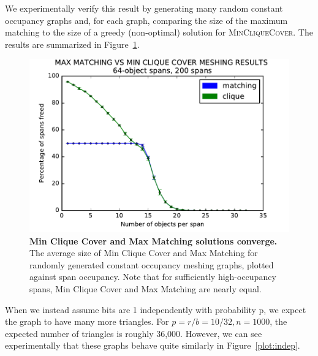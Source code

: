 We experimentally verify this result by generating many random constant occupancy graphs and, for each graph, comparing the size of the maximum matching to the size of a greedy (non-optimal) solution for \textsc{MinCliqueCover}.  The results are summarized in Figure~\ref{plot:const}.

\begin{figure}[h]
\includegraphics[scale = .5]{figures/const_match_comp.pdf}
\centering
\caption{\textbf{Min Clique Cover and Max Matching solutions converge.} The average size of Min Clique Cover and Max Matching for randomly generated constant occupancy meshing graphs, plotted against span occupancy.  Note that for sufficiently high-occupancy spans, Min Clique Cover and Max Matching are nearly equal.}
\label{plot:const}
\end{figure}



When we instead assume bits are 1 independently with probability p, we expect the graph to have many more triangles.  For $p = r/b = 10/32, n = 1000$, the expected number of triangles is roughly 36,000.  However, we can see experimentally that these graphs behave quite similarly in Figure~\ref{plot:indep}.


